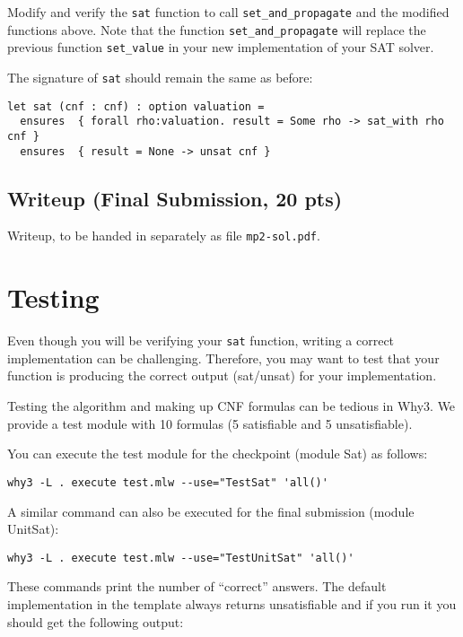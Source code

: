 \documentclass[11pt]{article}
\begin{document}
\begin{task}[10 pts]
Modify and verify the \verb|sat| function to call \verb|set_and_propagate| and the modified functions above. Note that the function \verb|set_and_propagate| will replace the previous function \verb|set_value| in your new implementation of your SAT solver.

The signature of \verb|sat| should remain the same as before:
\begin{lstlisting}
let sat (cnf : cnf) : option valuation =
  ensures  { forall rho:valuation. result = Some rho -> sat_with rho cnf }
  ensures  { result = None -> unsat cnf }
\end{lstlisting}
\end{task}

\subsection{Writeup (Final Submission, 20 pts)}

\begin{task}[20 pts]
Writeup, to be handed in separately as file \verb|mp2-sol.pdf|.  
\end{task}

\clearpage
\section{Testing}

Even though you will be verifying your \texttt{sat} function, writing a correct implementation can be challenging. Therefore, you may want to test that your function is producing the correct output (sat/unsat) for your implementation.

Testing the algorithm and making up CNF formulas can be tedious in Why3. We provide a test module with 10 formulas (5 satisfiable and 5 unsatisfiable).

You can execute the test module for the checkpoint (module Sat) as follows:
\begin{lstlisting}
why3 -L . execute test.mlw --use="TestSat" 'all()'
\end{lstlisting}

A similar command can also be executed for the final submission (module UnitSat):
\begin{lstlisting}
why3 -L . execute test.mlw --use="TestUnitSat" 'all()'
\end{lstlisting}

These commands print the number of ``correct'' answers. The default implementation in the template always returns unsatisfiable and if you run it you should get the following output: 
\end{document}
